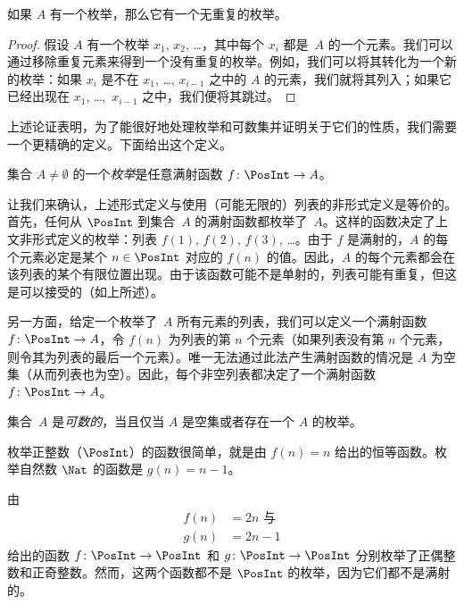 \documentclass[../../../include/open-logic-section]{subfiles}
\begin{document}
\begin{prop}
如果 $A$ 有一个枚举，那么它有一个无重复的枚举。
\end{prop}

\begin{proof}
假设 $A$ 有一个枚举 $x_1$, $x_2$, \dots{}，其中每个 $x_i$ 都是~$A$ 的一个元素。我们可以通过移除重复元素来得到一个没有重复的枚举。例如，我们可以将其转化为一个新的枚举：如果 $x_i$ 是不在 $x_1$, \dots, $x_{i-1}$ 之中的 $A$ 的元素，我们就将其列入；如果它已经出现在 $x_1$, \dots,~$x_{i-1}$ 之中，我们便将其跳过。
\end{proof}

上述论证表明，为了能很好地处理枚举和可数集并证明关于它们的性质，我们需要一个更精确的定义。下面给出这个定义。

\begin{defn}[枚举，形式化定义]
集合 $A \neq \emptyset$ 的一个\emph{枚举}是任意满射函数 $f \colon \PosInt \to A$。
\end{defn}

\begin{explain}
让我们来确认，上述形式定义与使用（可能无限的）列表的非形式定义是等价的。首先，任何从 $\PosInt$ 到集合~$A$ 的满射函数都枚举了~$A$。这样的函数决定了上文非形式定义的枚举：列表 $f(1)$, $f(2)$, $f(3)$, \dots。由于 $f$ 是满射的，$A$ 的每个元素必定是某个 $n \in \PosInt$ 对应的 $f(n)$ 的值。因此，$A$ 的每个元素都会在该列表的某个有限位置出现。由于该函数可能不是单射的，列表可能有重复，但这是可以接受的（如上所述）。

另一方面，给定一个枚举了~$A$ 所有元素的列表，我们可以定义一个满射函数 $f\colon \PosInt \to A$，令 $f(n)$ 为列表的第 $n$ 个元素（如果列表没有第 $n$ 个元素，则令其为列表的最后一个元素）。唯一无法通过此法产生满射函数的情况是 $A$ 为空集（从而列表也为空）。因此，每个非空列表都决定了一个满射函数 $f\colon \PosInt \to A$。
\end{explain}

\begin{defn}
  集合~$A$ 是\emph{可数的}，当且仅当 $A$ 是空集或者存在一个 $A$ 的枚举。
\end{defn}

\begin{ex}
枚举正整数（$\PosInt$）的函数很简单，就是由 $f(n) = n$ 给出的恒等函数。枚举自然数 $\Nat$ 的函数是 $g(n) = n - 1$。
\end{ex}

\begin{ex}
由
\begin{align*}
f(n) & = 2n \text{ 与}\\
g(n) & = 2n - 1
\end{align*}
给出的函数 $f\colon \PosInt \to \PosInt$ 和 $g \colon \PosInt \to
\PosInt$ 分别枚举了正偶整数和正奇整数。然而，这两个函数都不是 $\PosInt$ 的枚举，因为它们都不是满射的。
\end{ex}
\end{document}
